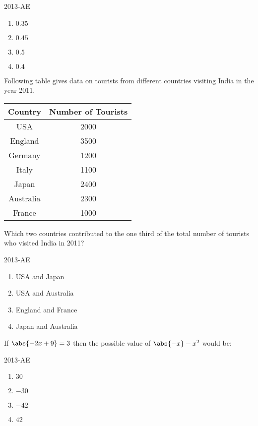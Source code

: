 \hfill{2013-AE}

\begin{enumerate}
    \item $0.35$
    \item $0.45$
    \item $0.5$
    \item $0.4$\\
\end{enumerate}

\item Following table gives data on tourists from different countries visiting India in the year 2011.

\begin{center}
\begin{tabular}{|c|c|}
\hline
Country & Number of Tourists \\
\hline
USA & 2000 \\
England & 3500 \\
Germany & 1200 \\
Italy & 1100 \\
Japan & 2400 \\
Australia & 2300 \\
France & 1000 \\
\hline
\end{tabular}
\end{center}
Which two countries contributed to the one third of the total number of tourists who visited India in 2011?

\hfill{2013-AE}

\begin{enumerate}
    \item USA and Japan
    \item USA and Australia
    \item England and France
    \item Japan and Australia\\
\end{enumerate}

\item If $\abs{ -2x + 9 } = 3$ then the possible value of $\abs{ -x} - x^2$ would be:

\hfill{2013-AE}

\begin{enumerate}
    \item $30$
    \item $-30$
    \item $-42$
    \item $42$\\
\end{enumerate}

